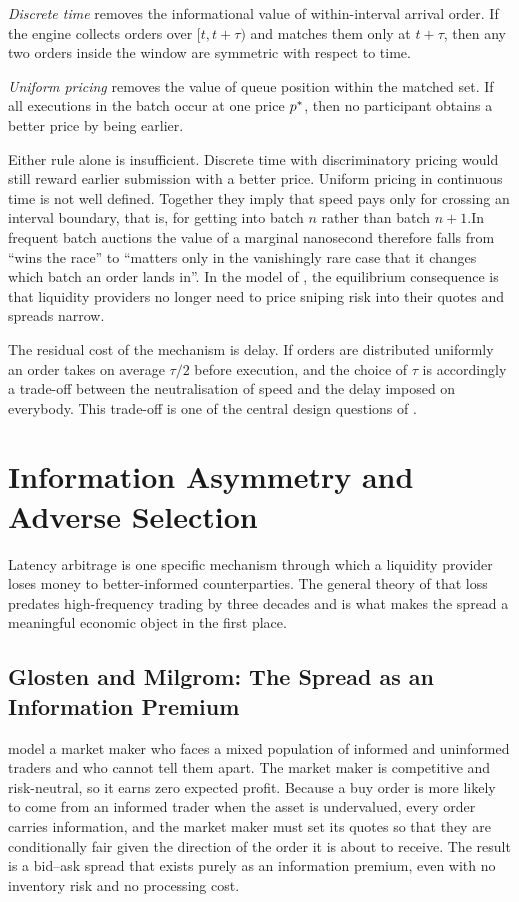 \emph{Discrete time} removes the informational value of within-interval
arrival order. If the engine collects orders over $[t, t+\tau)$ and
matches them only at $t+\tau$, then any two orders inside the window are
symmetric with respect to time.

\emph{Uniform pricing} removes the value of queue position within the
matched set. If all executions in the batch occur at one price $p^{\ast}$,
then no participant obtains a better price by being earlier.

Either rule alone is insufficient. Discrete time with discriminatory
pricing would still reward earlier submission with a better price.
Uniform pricing in continuous time is not well defined. Together they
imply that speed pays only for crossing an interval boundary, that is,
for getting into batch $n$ rather than batch $n+1$.In frequent batch auctions the value of a
marginal nanosecond therefore falls from ``wins the race'' to ``matters
only in the vanishingly rare case that it changes which batch an order
lands in''. In the model of \citet{budish2015hft}, the equilibrium
consequence is that liquidity providers no longer need to price
sniping risk into their quotes and spreads narrow.

The residual cost of the mechanism is delay. If orders are distributed uniformly  an order takes on
average $\tau/2$ before execution, and the choice of $\tau$ is
accordingly a trade-off between the neutralisation of speed and the
delay imposed on everybody. This trade-off is one of the central design
questions of .

\section{Information Asymmetry and Adverse Selection}
\label{sec:adverse}

Latency arbitrage is one specific mechanism through which a liquidity
provider loses money to better-informed counterparties. The general
theory of that loss predates high-frequency trading by three decades and
is what makes the spread a meaningful economic object in the first
place.

\subsection{Glosten and Milgrom: The Spread as an Information Premium}

\citet{glosten1985bid} model a market maker who faces a mixed population
of informed and uninformed traders and who cannot tell them apart. The
market maker is competitive and risk-neutral, so it earns zero expected
profit. Because a buy order is more likely to come from an informed
trader when the asset is undervalued, every order carries information,
and the market maker must set its quotes so that they are conditionally
fair given the direction of the order it is about to receive. The result
is a bid--ask spread that exists purely as an information premium, even
with no inventory risk and no processing cost.

